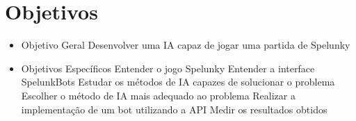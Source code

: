 \chapter{\label{chap:objectives}Objetivos}

\begin{itemize}
    \item Objetivo Geral
        \subitem Desenvolver uma IA capaz de jogar uma partida de Spelunky
    \item Objetivos Específicos
        \subitem Entender o jogo Spelunky
        \subitem Entender a interface SpelunkBots
        \subitem Estudar os métodos de IA capazes de solucionar o problema
        \subitem Escolher o método de IA mais adequado ao problema
        \subitem Realizar a implementação de um bot utilizando a API
        \subitem Medir os resultados obtidos
\end{itemize}
